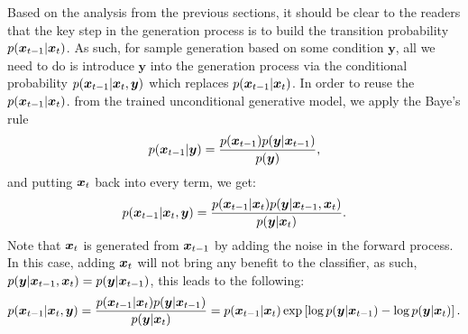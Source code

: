Based on the analysis from the previous sections, it should be clear to the readers that the key step in the generation process is to build the transition probability $p(\bm{x}_{t-1}|\bm{x}_{t})$. As such, for sample generation based on some condition $\bm{y}$, all we need to do is introduce $\bm{y}$  into the generation process via the conditional probability $p(\bm{x}_{t-1}|\bm{x}_{t},\bm{y})$ which replaces $p(\bm{x}_{t-1}|\bm{x}_{t})$. In order to reuse the $p(\bm{x}_{t-1}|\bm{x}_{t})$. from the trained unconditional generative model, we apply the Baye's rule
\begin{equation}
    \label{eq:9.1}
    p(\bm{x}_{t-1}|\bm{y})=\frac{p(\bm{x}_{t-1})p(\bm{y}|\bm{x}_{t-1})}{p(\bm{y})},
\end{equation}
and putting $\bm{x}_{t}$ back into every term, we get:
\begin{equation}
    \label{eq:9.2}
    p(\bm{x}_{t-1}|\bm{x}_{t},\bm{y})=\frac{p(\bm{x}_{t-1}|\bm{x}_{t})p(\bm{y}|\bm{x}_{t-1},\bm{x}_{t})}{p(\bm{y}|\bm{x}_{t})}.
\end{equation}
Note that $\bm{x}_{t}$ is generated from $\bm{x}_{t-1}$ by adding the noise in the forward process. In this case, adding $\bm{x}_{t}$ will not bring any benefit to the classifier, as such, $p(\bm{y}|\bm{x}_{t-1},\bm{x}_{t})=p(\bm{y}|\bm{x}_{t-1})$, this leads to the following:
\begin{equation}
    \label{eq:9.3}
    p(\bm{x}_{t-1}|\bm{x}_{t},\bm{y})=\frac{p(\bm{x}_{t-1}|\bm{x}_{t})p(\bm{y}|\bm{x}_{t-1})}{p(\bm{y}|\bm{x}_{t})}=p(\bm{x}_{t-1}|\bm{x}_{t})\exp\left[\log p(\bm{y}|\bm{x}_{t-1})-\log p(\bm{y}|\bm{x}_{t}) \right].
\end{equation}

